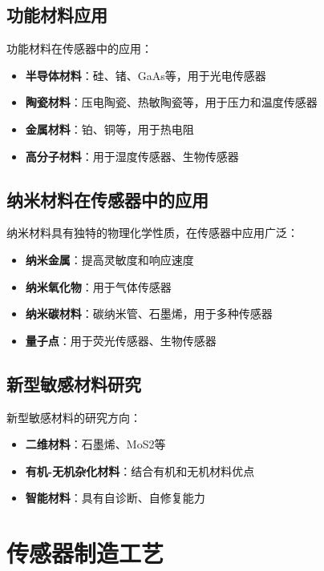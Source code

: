 \documentclass[12pt,UTF8]{ctexbook}
\begin{document}
\section{功能材料应用}

功能材料在传感器中的应用：

\begin{itemize}[leftmargin=2cm]
	\item \textbf{半导体材料}：硅、锗、GaAs等，用于光电传感器
	\item \textbf{陶瓷材料}：压电陶瓷、热敏陶瓷等，用于压力和温度传感器
	\item \textbf{金属材料}：铂、铜等，用于热电阻
	\item \textbf{高分子材料}：用于湿度传感器、生物传感器
\end{itemize}

\section{纳米材料在传感器中的应用}

纳米材料具有独特的物理化学性质，在传感器中应用广泛：

\begin{itemize}[leftmargin=2cm]
	\item \textbf{纳米金属}：提高灵敏度和响应速度
	\item \textbf{纳米氧化物}：用于气体传感器
	\item \textbf{纳米碳材料}：碳纳米管、石墨烯，用于多种传感器
	\item \textbf{量子点}：用于荧光传感器、生物传感器
\end{itemize}

\section{新型敏感材料研究}

新型敏感材料的研究方向：

\begin{itemize}[leftmargin=2cm]
	\item \textbf{二维材料}：石墨烯、MoS2等
	\item \textbf{有机-无机杂化材料}：结合有机和无机材料优点
	\item \textbf{智能材料}：具有自诊断、自修复能力
\end{itemize}

\chapter{传感器制造工艺}
\end{document}
